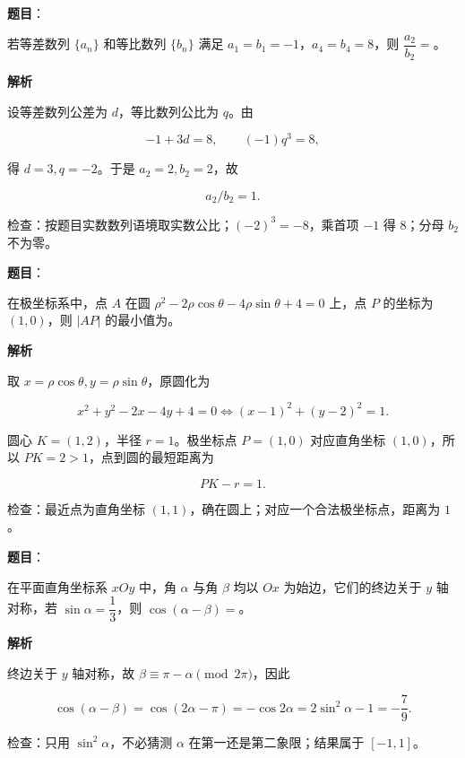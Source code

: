 \begin{answer}

\textbf{题目}：

若等差数列 $\{a_n\}$ 和等比数列 $\{b_n\}$ 满足 $a_1=b_1=-1$，$a_4=b_4=8$，则 $\dfrac{a_2}{b_2}=$\gkblank{}。

\textbf{解析}

设等差数列公差为 $d$，等比数列公比为 $q$。由

\nopagebreak[4]
\[-1+3d=8,\qquad(-1)q^3=8,\]

得 $d=3,q=-2$。于是 $a_2=2,b_2=2$，故

\nopagebreak[4]
\[\boxed{a_2/b_2=1}.\]

检查：按题目实数数列语境取实数公比；$(-2)^3=-8$，乘首项 $-1$ 得 $8$；分母 $b_2$ 不为零。


\end{answer}
\begin{answer}

\textbf{题目}：

在极坐标系中，点 $A$ 在圆 $\rho^2-2\rho\cos\theta-4\rho\sin\theta+4=0$ 上，点 $P$ 的坐标为 $(1,0)$，则 $|AP|$ 的最小值为\gkblank{}。

\textbf{解析}

取 $x=\rho\cos\theta,y=\rho\sin\theta$，原圆化为

\nopagebreak[4]
\[x^2+y^2-2x-4y+4=0\iff(x-1)^2+(y-2)^2=1.\]

圆心 $K=(1,2)$，半径 $r=1$。极坐标点 $P=(1,0)$ 对应直角坐标 $(1,0)$，所以 $PK=2>1$，点到圆的最短距离为

\nopagebreak[4]
\[\boxed{PK-r=1}.\]

检查：最近点为直角坐标 $(1,1)$，确在圆上；对应一个合法极坐标点，距离为 $1$。


\end{answer}
\begin{answer}

\textbf{题目}：

在平面直角坐标系 $xOy$ 中，角 $\alpha$ 与角 $\beta$ 均以 $Ox$ 为始边，它们的终边关于 $y$ 轴对称，若 $\sin\alpha=\dfrac13$，则 $\cos(\alpha-\beta)=$\gkblank{}。

\textbf{解析}

终边关于 $y$ 轴对称，故 $\beta\equiv\pi-\alpha\pmod{2\pi}$，因此

\nopagebreak[4]
\[
\cos(\alpha-\beta)=\cos(2\alpha-\pi)
=-\cos2\alpha=2\sin^2\alpha-1
=\boxed{-\frac79}.
\]

检查：只用 $\sin^2\alpha$，不必猜测 $\alpha$ 在第一还是第二象限；结果属于 $[-1,1]$。


\end{answer}
